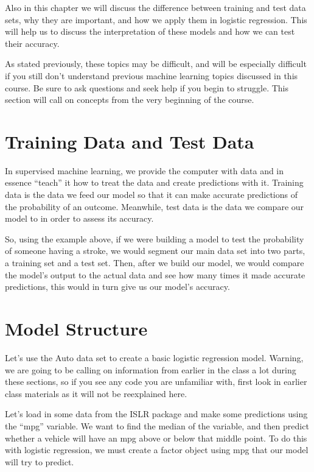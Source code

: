 \documentclass[
]{book}
\begin{document}
Also in this chapter we will discuss the difference between training and test data sets, why they are important, and how we apply them in logistic regression. This will help us to discuss the interpretation of these models and how we can test their accuracy.

As stated previously, these topics may be difficult, and will be especially difficult if you still don't understand previous machine learning topics discussed in this course. Be sure to ask questions and seek help if you begin to struggle. This section will call on concepts from the very beginning of the course.

\hypertarget{training-data-and-test-data}{%
\section{Training Data and Test Data}\label{training-data-and-test-data}}

In supervised machine learning, we provide the computer with data and in essence ``teach'' it how to treat the data and create predictions with it. Training data is the data we feed our model so that it can make accurate predictions of the probability of an outcome. Meanwhile, test data is the data we compare our model to in order to assess its accuracy.

So, using the example above, if we were building a model to test the probability of someone having a stroke, we would segment our main data set into two parts, a training set and a test set. Then, after we build our model, we would compare the model's output to the actual data and see how many times it made accurate predictions, this would in turn give us our model's accuracy.

\hypertarget{model-structure-1}{%
\section{Model Structure}\label{model-structure-1}}

Let's use the Auto data set to create a basic logistic regression model. Warning, we are going to be calling on information from earlier in the class a lot during these sections, so if you see any code you are unfamiliar with, first look in earlier class materials as it will not be reexplained here.

Let's load in some data from the ISLR package and make some predictions using the ``mpg'' variable. We want to find the median of the variable, and then predict whether a vehicle will have an mpg above or below that middle point. To do this with logistic regression, we must create a factor object using mpg that our model will try to predict.
\end{document}
